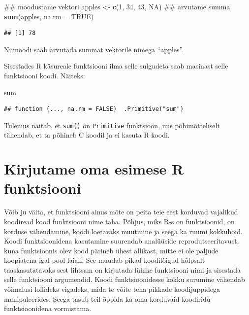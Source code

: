 \documentclass[]{book}
\newenvironment{Shaded}{\begin{snugshade}}{\end{snugshade}}
\newcommand{\KeywordTok}[1]{\textcolor[rgb]{0.13,0.29,0.53}{\textbf{#1}}}
\newcommand{\DataTypeTok}[1]{\textcolor[rgb]{0.13,0.29,0.53}{#1}}
\newcommand{\DecValTok}[1]{\textcolor[rgb]{0.00,0.00,0.81}{#1}}
\newcommand{\StringTok}[1]{\textcolor[rgb]{0.31,0.60,0.02}{#1}}
\newcommand{\OtherTok}[1]{\textcolor[rgb]{0.56,0.35,0.01}{#1}}
\newcommand{\NormalTok}[1]{#1}
\begin{document}
\begin{Shaded}
\begin{Highlighting}[]
\NormalTok{## moodustame vektori}
\NormalTok{apples <-}\StringTok{ }\KeywordTok{c}\NormalTok{(}\DecValTok{1}\NormalTok{, }\DecValTok{34}\NormalTok{, }\DecValTok{43}\NormalTok{, }\OtherTok{NA}\NormalTok{)}
\NormalTok{## arvutame summa}
\KeywordTok{sum}\NormalTok{(apples, }\DataTypeTok{na.rm =} \OtherTok{TRUE}\NormalTok{)}
\end{Highlighting}
\end{Shaded}

\begin{verbatim}
## [1] 78
\end{verbatim}

Niimoodi saab arvutada summat vektorile nimega ``apples''.

Sisestades R käsureale funktsiooni ilma selle sulgudeta saab masinast
selle funktsiooni koodi. Näiteks:

\begin{Shaded}
\begin{Highlighting}[]
\NormalTok{sum}
\end{Highlighting}
\end{Shaded}

\begin{verbatim}
## function (..., na.rm = FALSE)  .Primitive("sum")
\end{verbatim}

Tulemus näitab, et \texttt{sum()} on \texttt{Primitive} funktsioon, mis
põhimõtteliselt tähendab, et ta põhineb C koodil ja ei kasuta R koodi.

\section{Kirjutame oma esimese R
funktsiooni}\label{kirjutame-oma-esimese-r-funktsiooni}

Võib ju väita, et funktsiooni ainus mõte on peita teie eest korduvad
vajalikud koodiread kood funktsiooni nime taha. Põhjus, miks R-s on
funktsioonid, on korduse vähendamine, koodi loetavaks muutmine ja seega
ka ruumi kokkuhoid. Koodi funktsioonidena kasutamine suurendab
analüüside reprodutseeritavust, kuna funktsioonis olev kood pärineb
ühest allikast, mitte ei ole paljude koopiatena igal pool laiali. See
muudab pikad koodilõigud hõlpsalt taaskasutatavaks sest lihtsam on
kirjutada lühike funktsiooni nimi ja sisestada selle funktsiooni
argumendid. Koodi funktsioonidesse kokku surumine vähendab võimalusi
lollideks vigadeks, mida te võite teha pikkade koodijuppidega
manipuleerides. Seega tasub teil õppida ka oma korduvaid koodiridu
funktsioonidena vormistama.
\end{document}

